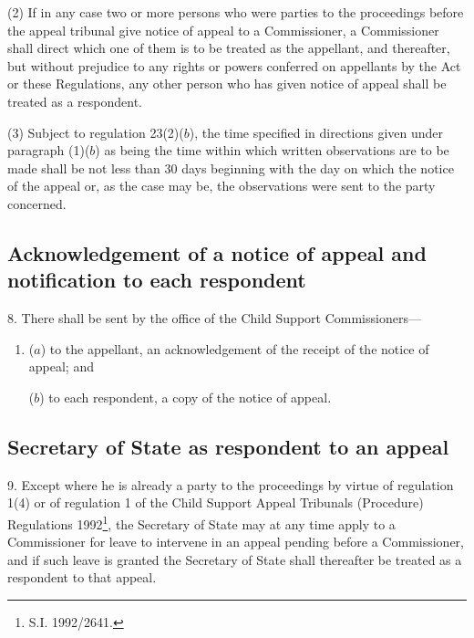 \documentclass[12pt,a4paper]{article}
\begin{document}
(2) If in any case two or more persons who were parties to the proceedings before the appeal tribunal give notice of appeal to a Commissioner, a Commissioner shall direct which one of them is to be treated as the appellant, and thereafter, but without prejudice to any rights or powers conferred on appellants by the Act or these Regulations, any other person who has given notice of appeal shall be treated as a respondent.

(3) Subject to regulation 23(2)($b$), the time specified in directions given under paragraph (1)($b$) as being the time within which written observations are to be made shall be not less than 30 days beginning with the day on which the notice of the appeal or, as the case may be, the observations were sent to the party concerned.

\subsection[8. Acknowledgement of a notice of appeal and notification to each respondent]{Acknowledgement of a notice of appeal and notification to each respondent}

8.  There shall be sent by the office of the Child Support Commissioners—
\begin{enumerate}\item[]
($a$) to the appellant, an acknowledgement of the receipt of the notice of appeal; and

($b$) to each respondent, a copy of the notice of appeal.
\end{enumerate}

\subsection[9. Secretary of State as respondent to an appeal]{Secretary of State as respondent to an appeal}

9.  
Except where he is already a party to the proceedings by virtue of regulation 1(4) or of regulation 1 of the Child Support Appeal Tribunals (Procedure) Regulations 1992\footnote{\frenchspacing S.I. 1992/2641.},  %
the Secretary of State may at any time apply to a Commissioner for leave to intervene in an appeal pending before a Commissioner, and if such leave is granted the Secretary of State shall thereafter be treated as a respondent to that appeal.

\end{document}
